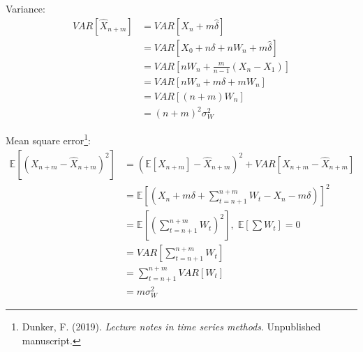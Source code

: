 \documentclass[10pt]{article}
\begin{document}
Variance:
\begin{align*}
VAR[\hat{X}_{n+m}]&=VAR[X_n+m\hat{\delta}]\\
&=VAR[X_0+n\delta+nW_n+m\hat{\delta}]\\
&=VAR[nW_n+\frac{m}{n-1}(X_n-X_1)]\\
&=VAR[nW_n+m\delta+mW_n]\\
&=VAR[(n+m)W_n]\\
&=(n+m)^2\sigma^2_W
\end{align*}

Mean square error\footnote{ Dunker, F. (2019). \textit{Lecture notes in time series methods}. Unpublished manuscript.}:
\begin{align*}
\mathbb{E}[(X_{n+m}-\hat{X}_{n+m})^2]&=(\mathbb{E}[X_{n+m}]-\hat{X}_{n+m})^2+VAR[X_{n+m}-\hat{X}_{n+m}]\\
&=\mathbb{E}[(X_n+m\delta+\sum^{n+m}_{t=n+1}W_t-X_n-m\delta)]^2\\
&=\mathbb{E}[(\sum^{n+m}_{t=n+1}W_t)^2],\;\mathbb{E}[\sum W_t]=0\\
&=VAR[\sum^{n+m}_{t=n+1}W_t]\\
&=\sum^{n+m}_{t=n+1}VAR[W_t]\\
&=m\sigma^2_W
\end{align*}
\end{document}
